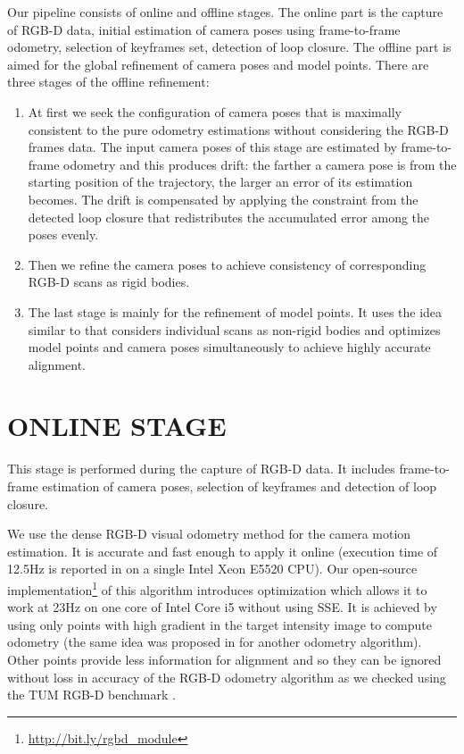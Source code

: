 \documentclass[letterpaper, 10 pt, conference]{ieeeconf}  %
\begin{document}
Our pipeline consists of online and offline stages. The online part is the capture of RGB-D data,
initial estimation of camera poses using frame-to-frame odometry,
selection of keyframes set, detection of loop closure. The offline part is aimed for
the global refinement of camera poses and model points. There are three stages
of the offline refinement:

\begin{enumerate}
\item At first we seek the configuration of camera poses that is
maximally consistent to the pure odometry estimations without 
considering the RGB-D frames data. The input camera poses of this stage
are estimated by frame-to-frame odometry and this produces drift: 
the farther a camera pose is from the starting position of the trajectory, 
the larger an error of its estimation becomes. The drift is compensated
by applying the constraint from the detected loop closure 
that redistributes the accumulated error among the poses evenly.

\item Then we refine the camera poses to achieve 
consistency of corresponding RGB-D scans as rigid bodies.

\item The last stage is mainly for the refinement of model points. It uses the idea similar to \cite{ruhnke2012highly}
that considers individual scans as non-rigid bodies and optimizes
model points and camera poses simultaneously to achieve highly accurate alignment.

\end{enumerate}

\section{ONLINE STAGE}

This stage is performed during the capture of RGB-D data. It includes
frame-to-frame estimation of camera poses, selection of keyframes and 
detection of loop closure.

We use the dense RGB-D visual odometry
method \cite{steinbrucker2011real} for the camera motion estimation.
It is accurate and fast enough to apply it online
(execution time of 12.5Hz is reported in \cite{steinbrucker2011real}
on a single Intel Xeon E5520 CPU).
Our open-source implementation\footnote{\label{note1}\href{http://bit.ly/rgbd\_module}{http://bit.ly/rgbd\_module}} of this algorithm
introduces optimization which allows it to work at 23Hz on one core
of Intel Core i5 without using SSE.
It is achieved by using only points with high gradient in the target intensity image
to compute odometry (the same idea was proposed in \cite{tykkala2011direct} for another odometry algorithm).
Other points provide less information for alignment
and so they can be ignored without loss in accuracy of the RGB-D odometry algorithm
as we checked using the TUM RGB-D benchmark \cite{sturm12iros}.
\end{document}
